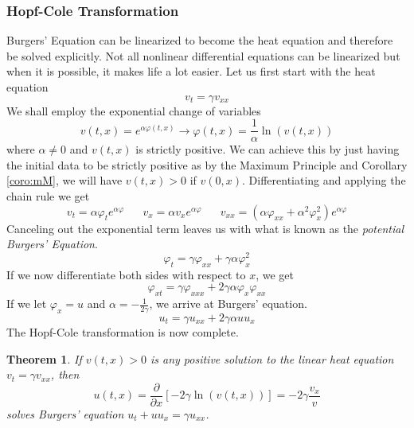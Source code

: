 \documentclass{article}
\newcommand{\pd}[2]{\frac{\partial #1}{\partial #2}}
\newtheorem{theorem}{Theorem}[section]
\numberwithin{equation}{section}
\begin{document}
\subsubsection{Hopf-Cole Transformation} 
Burgers' Equation can be linearized to become the heat equation and therefore be solved explicitly. Not all nonlinear differential equations can be linearized but when it is possible, it makes life a lot easier. Let us first start with the heat equation 
\begin{equation*}
    v_t = \gamma v_{xx}
\end{equation*}
We shall employ the exponential change of variables 
\begin{equation*}
    v(t,x) = e^{\alpha \varphi(t,x)} \rightarrow \varphi(t,x) = \frac{1}{\alpha}\ln (v(t,x))
\end{equation*}
where $\alpha \neq 0$ and $v(t,x)$ is strictly positive. We can achieve this by just having the initial data to be strictly positive as by the Maximum Principle and Corollary \ref{coro:mM}, we will have $v(t,x) > 0$ if $v(0,x)$. Differentiating and applying the chain rule we get 
\begin{equation*}
    v_t = \alpha\varphi_te^{\alpha \varphi} \hspace{20pt} v_x = \alpha v_x e^{\alpha \varphi} \hspace{20pt} v_{xx} = (\alpha \varphi_{xx}+\alpha^2\varphi_x^2)e^{\alpha \varphi} 
\end{equation*}
Canceling out the exponential term leaves us with what is known as the \textit{potential Burgers' Equation}. 
\begin{equation}
    \varphi_t= \gamma\varphi_{xx}+\gamma\alpha \varphi_x^2 \label{eq:pbe}
\end{equation}
If we now differentiate both sides with respect to $x$, we get
\begin{equation}
    \varphi_{xt} = \gamma \varphi_{xxx}+2\gamma \alpha \varphi_{x} \varphi_{xx} \label{eq:3.53}
\end{equation}
If we let $\varphi_x=u$ and $\alpha =-\frac{1}{2\gamma}$, we arrive at Burgers' equation.
\begin{equation*}
    u_t = \gamma u_{xx} + 2\gamma \alpha uu_{x}
\end{equation*}
The Hopf-Cole transformation is now complete.
\begin{theorem}
    If $v(t,x) >0$ is any positive solution to the linear heat equation $v_t=\gamma v_{xx}$, then 
    \begin{equation}
        u(t,x) =\pd{}{x} [-2\gamma \ln(v(t,x))] =  -2\gamma \frac{v_x}{v}
    \end{equation}
    solves Burgers' equation $u_t +uu_x = \gamma u_{xx}$.
\end{theorem}
\end{document}
